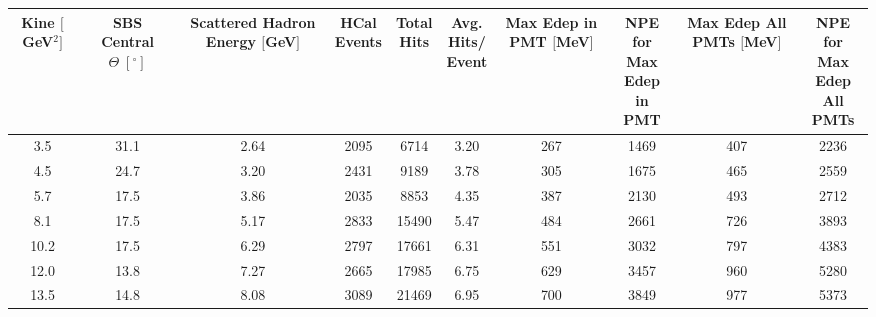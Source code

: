 \documentclass[10pt]{article}
\begin{document}
	\begin{table}[!ht]
	\centering
	\begin{tabular}{|c|ccccccccc|}
	\hline
	\makecell{Kine\\$[$GeV$^2]$} & \makecell{SBS\\Central\\$\Theta \; [^{\circ}]$} & \makecell{Scattered\\Hadron\\Energy\\$[$GeV$]$} & \makecell{HCal\\Events} & \makecell{Total\\Hits} & \makecell{Avg.\\Hits/\\Event}& \makecell{Max Edep\\in PMT\\$[$MeV$]$} & \makecell{NPE for\\Max Edep\\in PMT} & \makecell{Max Edep\\All PMTs\\$[$MeV$]$} & \makecell{NPE for\\Max Edep\\All PMTs}\\
	\hline
	3.5 & 31.1 & 2.64 & 2095 & 6714 & 3.20 & 267 & 1469 & 407 & 2236 \\
    4.5 & 24.7 & 3.20 & 2431 & 9189 & 3.78 & 305 & 1675 & 465 & 2559 \\
    5.7 & 17.5 & 3.86 & 2035 & 8853 & 4.35 & 387 & 2130 & 493 & 2712 \\
    8.1 & 17.5 & 5.17 & 2833 & 15490 & 5.47 & 484 & 2661 & 726 & 3893 \\
    10.2 & 17.5 & 6.29 & 2797 & 17661 & 6.31 & 551 & 3032 & 797 & 4383 \\
    12.0 & 13.8 & 7.27 & 2665 & 17985 & 6.75 & 629 & 3457 & 960 & 5280 \\
    13.5 & 14.8 & 8.08 & 3089 & 21469 & 6.95 & 700 & 3849 & 977 & 5373 \\

\end{tabular}
\end{table}
\end{document}

